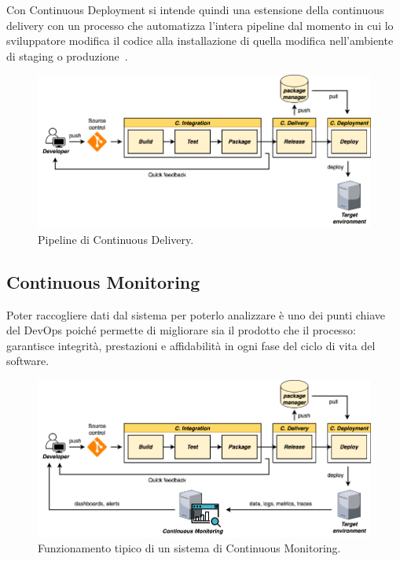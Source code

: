 Con Continuous Deployment si intende quindi una estensione della continuous delivery con un processo che automatizza l'intera pipeline dal momento in cui lo sviluppatore modifica il codice alla installazione di quella modifica nell'ambiente di staging o produzione~\cite{krief2019learning}.

\begin{figure}[H]
    \centering
    \includegraphics[width=1\textwidth]{img/cdeploy-pipeline.png}
    \caption{Pipeline di Continuous Delivery.}
    \label{cdeploy-pipeline}
\end{figure}

\subsection{Continuous Monitoring}
Poter raccogliere dati dal sistema per poterlo analizzare è uno dei punti chiave del DevOps poiché permette di migliorare sia il prodotto che il processo: garantisce integrità, prestazioni e affidabilità in ogni fase del ciclo di vita del software.

\begin{figure}[H]
    \centering
    \includegraphics[width=1\textwidth]{img/ci-monitoring.png}
    \caption{Funzionamento tipico di un sistema di Continuous Monitoring.}
    \label{ci-monitoring}
\end{figure}


